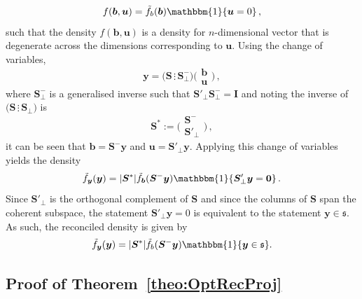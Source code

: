 \documentclass[a4paper,12pt]{article}
\theoremstyle{definition}
\begin{document}
\begin{equation}
f(\bm{b},\bm{u})=\tilde{f}_b(\bm{b})\mathbbm{1}\{\bm{u}=0\}\,,
\end{equation}
such that the density $f(\bm{b},\bm{u})$ is a density for $n$-dimensional vector that is degenerate across the dimensions corresponding to $\bm{u}$. Using the change of variables,
\[
\bm{y}=\big(\bm{S}\,\vdots\,\bm{S}^-_{\perp}\big)\bigg(\begin{matrix}\bm{b}\\[-0.3cm]
\bm{u}
\end{matrix}\bigg)\,,
\]
where $\bm{S}^-_{\perp}$ is a generalised inverse such that $\bm{S}'_{\perp}\bm{S}^-_{\perp}=\bm{I}$ and noting the inverse of $\big(\bm{S}\,\vdots\,\bm{S}_{\perp}\big)$ is
\[
\bm{S}^*:=\bigg(\begin{matrix}\bm{S}^{-}\\[-0.2cm]\bm{S}'_{\perp}\end{matrix}\bigg)\,,
\]
it can be seen that $\bm{b}=\bm{S}^-\bm{y}$ and $\bm{u}=\bm{S}'_\perp\bm{y}$. Applying this change of variables yields the density
\[
\tilde{f}_{\bm{y}}(\bm{y})=|\bm{S}^*|\tilde{f}_{\bm{b}}(\bm{S}^-\bm{y})\mathbbm{1}\{\bm{S}'_\perp\bm{y}=\bm{0}\}\,.
\]
Since $\bm{S}'_\perp$ is the orthogonal complement of $\bm{S}$ and since the columns of $\bm{S}$ span the coherent subspace, the statement $\bm{S}'_\perp\bm{y}=0$ is equivalent to the statement $\bm{y}\in\mathfrak{s}$. As such, the reconciled density is given by
\[
\tilde{f}_{\bm{y}}(\bm{y})=|\bm{S}^*|\tilde{f}_b(\bm{S}^-\bm{y})\mathbbm{1}\{\bm{y}\in\mathfrak{s}\}.
\]

\subsection{Proof of Theorem~\ref{theo:OptRecProj}}
\label{app:OptRecProj}
\end{document}
